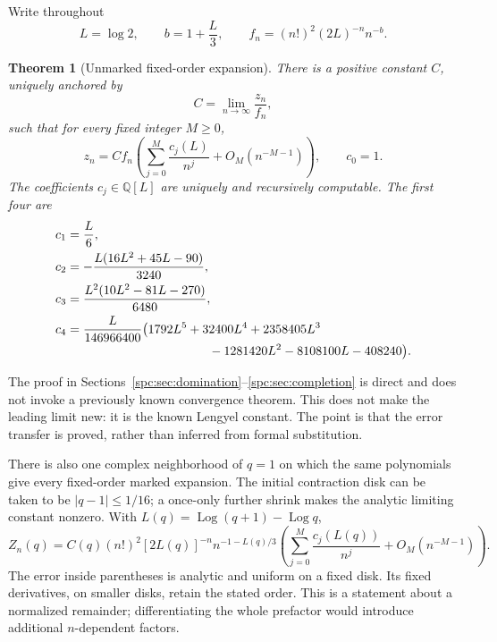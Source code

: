 \documentclass[11pt,letterpaper]{article}
\newtheorem{theorem}{Theorem}[section]
\theoremstyle{definition}\newtheorem{definition}[theorem]{Definition}
\theoremstyle{remark}\newtheorem{remark}[theorem]{Remark}
\newcommand{\Q}{\mathbb Q}
\newcommand{\Log}{\operatorname{Log}}
\begin{document}
Write throughout
\begin{equation}\label{spc:eq:scale}
 L=\log 2,\qquad b=1+\frac L3,\qquad
 f_n=(n!)^2(2L)^{-n}n^{-b}.
\end{equation}
\begin{theorem}[Unmarked fixed-order expansion]\label{spc:thm:main}
There is a positive constant $C$, uniquely anchored by
\begin{equation}\label{spc:eq:C}
 C=\lim_{n\to\infty}\frac{z_n}{f_n},
\end{equation}
such that for every fixed integer $M\ge0$,
\begin{equation}\label{spc:eq:expansion}
 z_n=Cf_n\left(\sum_{j=0}^{M}\frac{c_j(L)}{n^j}
                  +O_M(n^{-M-1})\right),\qquad c_0=1.
\end{equation}
The coefficients $c_j\in\Q[L]$ are uniquely and recursively computable. The first four are
\begin{align}
 c_1&=\frac L6,\label{spc:eq:cs}\\
 c_2&=-\frac{L(16L^2+45L-90)}{3240},\notag\\
 c_3&=\frac{L^2(10L^2-81L-270)}{6480},\notag\\
 c_4&=\frac{L}{146966400}\bigl(1792L^5+32400L^4+2358405L^3\notag\\[-2pt]
    &\hspace{40mm}{}-1281420L^2-8108100L-408240\bigr).\notag
\end{align}
\end{theorem}
The proof in Sections~\ref{spc:sec:domination}--\ref{spc:sec:completion} is direct and does not invoke a previously known convergence theorem. This does not make the leading limit new: it is the known Lengyel constant. The point is that the error transfer is proved, rather than inferred from formal substitution.

There is also one complex neighborhood of $q=1$ on which the same polynomials give every fixed-order marked expansion. The initial contraction disk can be taken to be $|q-1|\le1/16$; a once-only further shrink makes the analytic limiting constant nonzero. With $L(q)=\Log(q+1)-\Log q$,
\begin{equation}\label{spc:eq:markedintro}
 Z_n(q)=C(q)(n!)^2[2L(q)]^{-n}n^{-1-L(q)/3}
 \left(\sum_{j=0}^{M}\frac{c_j(L(q))}{n^j}+O_M(n^{-M-1})\right).
\end{equation}
The error inside parentheses is analytic and uniform on a fixed disk. Its fixed derivatives, on smaller disks, retain the stated order. This is a statement about a normalized remainder; differentiating the whole prefactor would introduce additional $n$-dependent factors.
\end{document}
